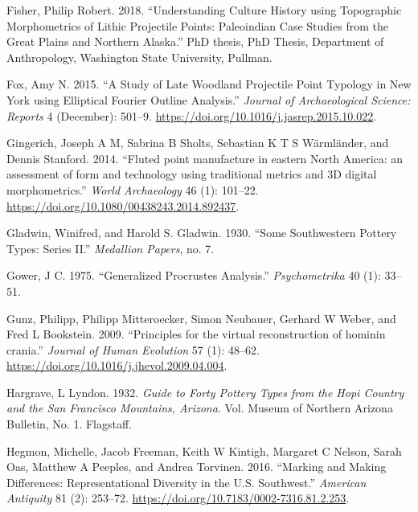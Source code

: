 \documentclass{article}
\newlength{\cslhangindent}
\newlength{\cslentryspacingunit} %
\newenvironment{CSLReferences}[2] %
 {%
  \setlength{\parindent}{0pt}
  \ifodd #1
  \let\oldpar\par
  \def\par{\hangindent=\cslhangindent\oldpar}
  \fi
  \setlength{\parskip}{#2\cslentryspacingunit}
 }%
 {}
\begin{document}
\begin{CSLReferences}{1}{0}
\leavevmode{}%
Fisher, Philip Robert. 2018. {``{Understanding Culture History using
Topographic Morphometrics of Lithic Projectile Points: Paleoindian Case
Studies from the Great Plains and Northern Alaska}.''} PhD thesis, PhD
Thesis, Department of Anthropology, Washington State University,
Pullman.

\leavevmode{}%
Fox, Amy N. 2015. {``{A Study of Late Woodland Projectile Point Typology
in New York using Elliptical Fourier Outline Analysis}.''} \emph{Journal
of Archaeological Science: Reports} 4 (December): 501--9.
\url{https://doi.org/10.1016/j.jasrep.2015.10.022}.

\leavevmode{}%
Gingerich, Joseph A M, Sabrina B Sholts, Sebastian K T S Wärmländer, and
Dennis Stanford. 2014. {``{Fluted point manufacture in eastern North
America: an assessment of form and technology using traditional metrics
and 3D digital morphometrics}.''} \emph{World Archaeology} 46 (1):
101--22. \url{https://doi.org/10.1080/00438243.2014.892437}.

\leavevmode{}%
Gladwin, Winifred, and Harold S. Gladwin. 1930. {``Some Southwestern
Pottery Types: Series II.''} \emph{Medallion Papers}, no. 7.

\leavevmode{}%
Gower, J C. 1975. {``{Generalized Procrustes Analysis}.''}
\emph{Psychometrika} 40 (1): 33--51.

\leavevmode{}%
Gunz, Philipp, Philipp Mitteroecker, Simon Neubauer, Gerhard W Weber,
and Fred L Bookstein. 2009. {``{Principles for the virtual
reconstruction of hominin crania}.''} \emph{Journal of Human Evolution}
57 (1): 48--62. \url{https://doi.org/10.1016/j.jhevol.2009.04.004}.

\leavevmode{}%
Hargrave, L Lyndon. 1932. \emph{{Guide to Forty Pottery Types from the
Hopi Country and the San Francisco Mountains, Arizona}}. Vol. Museum of
Northern Arizona Bulletin, No. 1. Flagstaff.

\leavevmode{}%
Hegmon, Michelle, Jacob Freeman, Keith W Kintigh, Margaret C Nelson,
Sarah Oas, Matthew A Peeples, and Andrea Torvinen. 2016. {``{Marking and
{Making} {Differences}: {Representational} {Diversity} in the {U}.{S}.
{Southwest}}.''} \emph{American Antiquity} 81 (2): 253--72.
\url{https://doi.org/10.7183/0002-7316.81.2.253}.


\end{CSLReferences}
\end{document}

